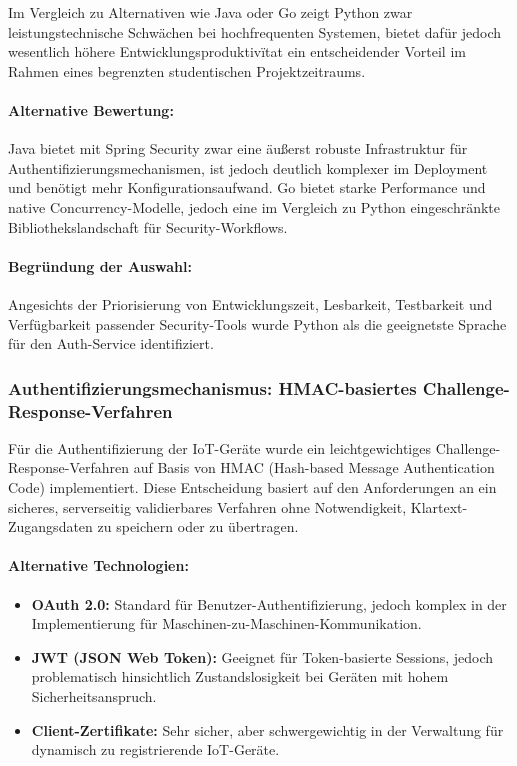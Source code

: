 Im Vergleich zu Alternativen wie Java oder Go zeigt Python zwar leistungstechnische Schw\"achen bei hochfrequenten Systemen, bietet daf\"ur jedoch wesentlich h\"ohere Entwicklungsproduktiv\"itat \textendash{} ein entscheidender Vorteil im Rahmen eines begrenzten studentischen Projektzeitraums.

\paragraph*{Alternative Bewertung:}

Java bietet mit Spring Security zwar eine \"au\ss{}erst robuste Infrastruktur f\"ur Authentifizierungsmechanismen, ist jedoch deutlich komplexer im Deployment und ben\"otigt mehr Konfigurationsaufwand. Go bietet starke Performance und native Concurrency-Modelle, jedoch eine im Vergleich zu Python eingeschr\"ankte Bibliothekslandschaft f\"ur Security-Workflows. 

\paragraph*{Begr\"undung der Auswahl:}

Angesichts der Priorisierung von Entwicklungszeit, Lesbarkeit, Testbarkeit und Verf\"ugbarkeit passender Security-Tools wurde Python als die geeignetste Sprache f\"ur den Auth-Service identifiziert.

\subsubsection*{Authentifizierungsmechanismus: HMAC-basiertes Challenge-Response-Verfahren}

F\"ur die Authentifizierung der IoT-Ger\"ate wurde ein leichtgewichtiges Challenge-Response-Verfahren auf Basis von HMAC (Hash-based Message Authentication Code) implementiert. Diese Entscheidung basiert auf den Anforderungen an ein sicheres, serverseitig validierbares Verfahren ohne Notwendigkeit, Klartext-Zugangsdaten zu speichern oder zu \"ubertragen.

\paragraph*{Alternative Technologien:}
\begin{itemize}
  \item \textbf{OAuth 2.0:} Standard f\"ur Benutzer-Authentifizierung, jedoch komplex in der Implementierung f\"ur Maschinen-zu-Maschinen-Kommunikation.
  \item \textbf{JWT (JSON Web Token):} Geeignet f\"ur Token-basierte Sessions, jedoch problematisch hinsichtlich Zustandslosigkeit bei Ger\"aten mit hohem Sicherheitsanspruch.
  \item \textbf{Client-Zertifikate:} Sehr sicher, aber schwergewichtig in der Verwaltung f\"ur dynamisch zu registrierende IoT-Ger\"ate.
\end{itemize}

